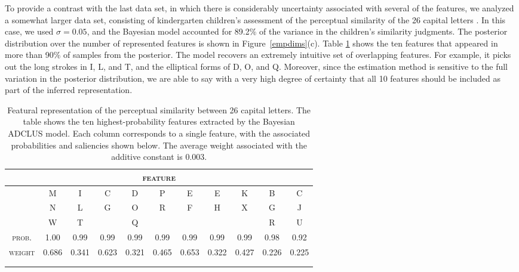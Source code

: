\documentclass[11pt]{article}
\newcommand{\capspace}{}
\begin{document}
To provide a contrast with the last data set, in which there is considerably uncertainty associated with several of the features, we analyzed a somewhat larger data set, consisting of kindergarten children's assessment of the perceptual similarity of the 26 capital letters \cite{gibson63}. In this case, we used $\sigma = 0.05$, and the Bayesian model accounted for 89.2\% of the variance in the children's similarity judgments. The posterior distribution over the number of represented features is shown in Figure~\ref{empdims}(c). Table \ref{lettreps} shows the ten features that appeared in more than 90\% of samples from the posterior. The model recovers an extremely intuitive set of overlapping features. For example, it picks out the long strokes in \textsf{I}, \textsf{L}, and \textsf{T}, and the elliptical forms of \textsf{D}, \textsf{O}, and \textsf{Q}. Moreover, since the estimation method is sensitive to the full variation in the posterior distribution, we are able to say with a very high degree of certainty that all 10 features should be included as part of the inferred representation.


\begin{table}[t]
\caption{\capspace Featural representation of the perceptual similarity between 26 capital letters. The table shows the ten highest-probability features extracted by the Bayesian ADCLUS model. Each column corresponds to a single feature, with the associated probabilities and saliencies shown below. The average weight associated with the additive constant is 0.003.}
\label{lettreps} \begin{center}
\footnotesize
    \begin{tabular}{ccccccccccc}\\
      \hline
      \multicolumn{11}{c}{\textsc{feature}} \\
      \hline
 & \textsf{M} & \textsf{I} & \textsf{C} & \textsf{D} & \textsf{P} & \textsf{E} & \textsf{E} & \textsf{K} & \textsf{B} & \textsf{C} \\
 & \textsf{N} & \textsf{L} & \textsf{G} & \textsf{O} & \textsf{R} & \textsf{F} & \textsf{H} & \textsf{X} & \textsf{G} & \textsf{J} \\
 & \textsf{W} & \textsf{T} & & \textsf{Q} & & & & & \textsf{R} & \textsf{U} \\
      \hline
\textsc{prob.} & 1.00 & 0.99 & 0.99 & 0.99 & 0.99 & 0.99 & 0.99 & 0.99 & 0.98 & 0.92 \\
\textsc{weight} &  0.686 & 0.341 & 0.623 & 0.321 & 0.465 & 0.653 & 0.322 & 0.427 & 0.226 & 0.225 \\
\hline \\ \\
    \end{tabular}
\end{center}
\end{table}
\end{document}
